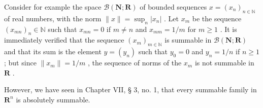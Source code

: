 Consider for example the space \(\mathcal{B}(\mathbf{N};\mathbf{R})\) of bounded sequences \(x = (x_{n})_{n\in \mathbb{N}}\) of real numbers, with the norm \(\| x\| = \sup_n |x_n|\) . Let \(x_{m}\) be the sequence \((x_{mn})_n\in \mathbb{N}\) such that \(x_{mn} = 0\) if \(m\neq n\) and \(x_{mm} = 1 / m\) for \(m\geqslant 1\) . It is immediately verified that the sequence \((x_m)_{m\in \mathbb{N}}\) is summable in \(\mathcal{B}(\mathbf{N};\mathbf{R})\) and that its sum is the element \(y = (y_{n})\) such that \(y_0 = 0\) and \(y_{n} = 1 / n\) if \(n\geqslant 1\) ; but since \(\| x_m\| = 1 / m\) , the sequence of norms of the \(x_{m}\) is not summable in \(\mathbf{R}\) .

However, we have seen in Chapter VII, § 3, no. 1, that every summable family in \(\mathbf{R}^n\) is absolutely summable.

